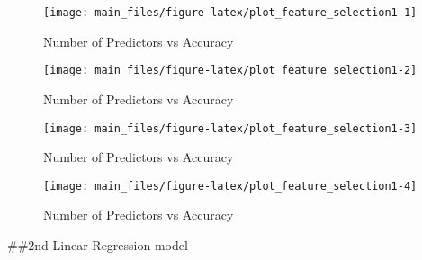 \begin{Schunk}
\begin{figure}[H]

{\centering \texttt{[image: main\_files/figure-latex/plot\_feature\_selection1-1]} 

}

\caption[Number of Predictors vs Accuracy]{Number of Predictors vs Accuracy}\label{fig:plot_feature_selection11}
\end{figure}
\begin{figure}[H]

{\centering \texttt{[image: main\_files/figure-latex/plot\_feature\_selection1-2]} 

}

\caption[Number of Predictors vs Accuracy]{Number of Predictors vs Accuracy}\label{fig:plot_feature_selection12}
\end{figure}
\begin{figure}[H]

{\centering \texttt{[image: main\_files/figure-latex/plot\_feature\_selection1-3]} 

}

\caption[Number of Predictors vs Accuracy]{Number of Predictors vs Accuracy}\label{fig:plot_feature_selection13}
\end{figure}
\begin{figure}[H]

{\centering \texttt{[image: main\_files/figure-latex/plot\_feature\_selection1-4]} 

}

\caption[Number of Predictors vs Accuracy]{Number of Predictors vs Accuracy}\label{fig:plot_feature_selection14}
\end{figure}
\end{Schunk}

\#\#2nd Linear Regression model

